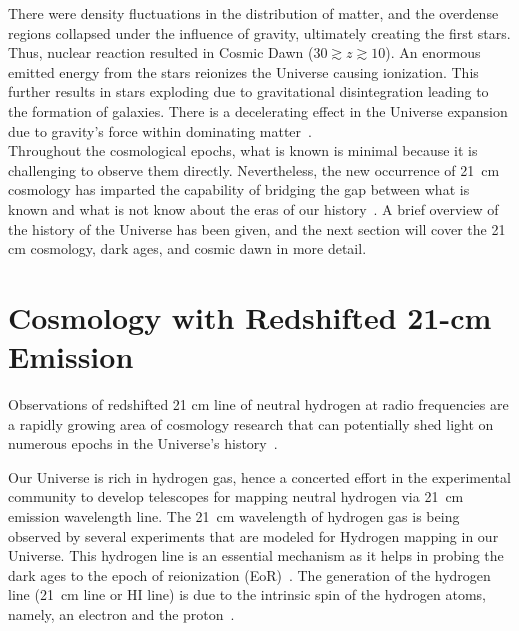 	There were density fluctuations in the distribution of matter, and the overdense regions collapsed under the influence of gravity, ultimately creating the first stars. Thus, nuclear reaction resulted in Cosmic Dawn ($30\gtrsim z \gtrsim 10$). An enormous emitted energy from the stars reionizes the Universe causing ionization. This further results in stars exploding due to gravitational disintegration leading to the formation of galaxies. There is a decelerating effect in the Universe expansion due to gravity's force within dominating matter~\citep{2017arXiv170808521D, 2012AdSpR..49..433B}.\\
	
	Throughout the cosmological epochs, what is known is minimal because it is challenging to observe them directly. Nevertheless, the new occurrence of \SI{21}{cm} cosmology has imparted the capability of bridging the gap between what is known and what is not know about the eras of our history~\citep{2014ApJ...782L...9V, 2013PhRvD..87d3002L}. A brief overview of the history of the Universe has been given, and the next section will cover the 21 cm cosmology, dark ages, and cosmic dawn in more detail.
	           
	\section{Cosmology with Redshifted 21-cm Emission}
	
	
		
	Observations of redshifted 21 cm line of neutral hydrogen at radio frequencies are a rapidly growing area of cosmology research that can potentially shed light on numerous epochs in the Universe's history~\citep{2012RPPh...75h6901P}.
	
	Our Universe is rich in hydrogen gas, hence a concerted effort in the experimental community to develop telescopes for mapping neutral hydrogen via \SI{21}{cm} emission wavelength line. The \SI{21}{cm} wavelength of hydrogen gas is being observed by several experiments that are modeled for Hydrogen mapping in our Universe. This hydrogen line is an essential mechanism as it helps in probing the dark ages to the epoch of reionization (EoR)~\citep{2013PhRvD..87d3002L,2014ApJ...782...66P}. The generation of the hydrogen line (\SI{21}{cm} line or HI line) is due to the intrinsic spin of the hydrogen atoms, namely, an electron and the proton~\citep{book:832129}.\\
	
